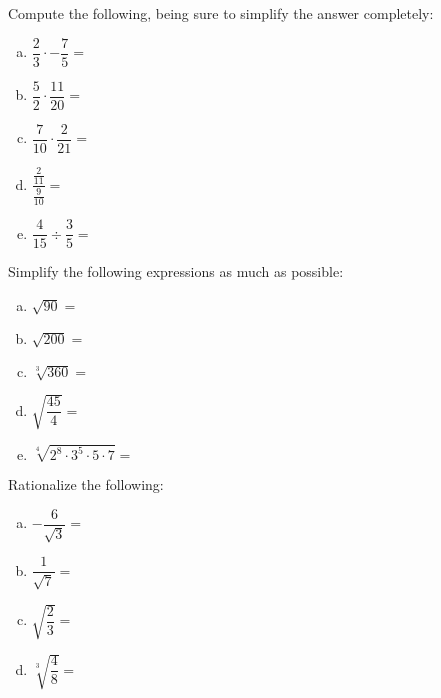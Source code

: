 \documentclass[11pt,letterpaper]{article}
\begin{document}
\vfill



 Compute the following, being sure to simplify the answer completely:
\begin{enumerate}[(a)] \itemsep=2ex
\item $\dfrac{2}{3} \cdot -\dfrac{7}{5}=$
\item $\dfrac{5}{2} \cdot \dfrac{11}{20}=$
\item $\dfrac{7}{10} \cdot \dfrac{2}{21}=$
\item $\dfrac{\frac{2}{11}}{\frac{9}{10}}=$
\item $\dfrac{4}{15} \div \dfrac{3}{5}=$
\end{enumerate}



\vfill



 Simplify the following expressions as much as possible:
\begin{enumerate}[(a)] \itemsep=2ex
\item $\sqrt{90}=$
\item $\sqrt{200}=$
\item $\sqrt[3]{360}=$
\item $\sqrt{\dfrac{45}{4}}=$
\item $\sqrt[4]{2^8 \cdot 3^5 \cdot 5 \cdot 7}=$
\end{enumerate}



\vfill
\newpage



 Rationalize the following: \pspace
\begin{enumerate}[(a)] \itemsep=2ex
\item $-\dfrac{6}{\sqrt{3}}=$
\item $\dfrac{1}{\sqrt{7}}=$
\item $\sqrt{\dfrac{2}{3}}=$
\item $\sqrt[3]{\dfrac{4}{8}}=$
\end{enumerate} 



\vfill
\end{document}
